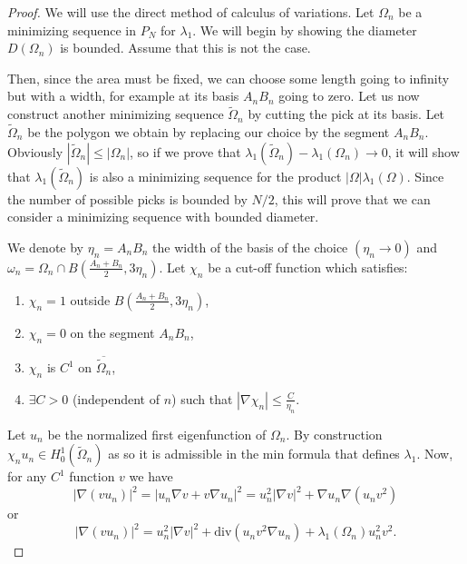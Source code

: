 \documentclass[12pt]{report}
\numberwithin{definition}{section}
\begin{document}
\begin{proof}

  We will use the direct method of calculus of variations.
  Let $\Omega_{n}$ be a minimizing sequence in $P_{N}$ for $\lambda_1$.
  We will begin by showing the diameter $D(\Omega_{n})$ is bounded.
  Assume that this is not the case.

  Then, since the area must be fixed, we can choose some length going to infinity but with a width, for example at its basis $A_{n}B_{n}$ going to zero.
  Let us now construct another minimizing sequence $\widetilde{\Omega}_{n}$ by cutting the pick at its basis.
  Let $\widetilde{\Omega}_{n}$ be the polygon we obtain by replacing our choice by the segment $A_{n}B_{n}$.
  Obviously $| \widetilde{\Omega}_{n} | \leq | \Omega_{n} | $, so if we prove that $\lambda_{1}(\widetilde{\Omega}_{n}) - \lambda_{1}(\Omega_{n}) \to 0$, it will show that $\lambda_{1}(\widetilde{\Omega}_{n})$ is also a minimizing sequence for the product $| \Omega | \lambda_{1}(\Omega)$.
  Since the number of possible picks is bounded by $N / 2$, this will prove that we can consider a minimizing sequence with bounded diameter.

  We denote by $\eta_{n} = A_{n}B_{n}$ the width of the basis of the choice $(\eta_{n} \to 0)$ and $\omega_{n} = \Omega_{n} \cap B(\frac{A_{n} + B_{n}}{2}, 3\eta_{n})$.
  Let $\chi_{n}$ be a cut-off function which satisfies:
  \begin{enumerate}
    \item $\chi_{n} = 1$ outside $B(\frac{A_{n} + B_{n}}{2}, 3\eta_{n})$,
    \item $\chi_{n} = 0$ on the segment $A_{n}B_{n}$,
    \item $\chi_{n}$ is $C^{1}$ on $\overline{\widetilde{\Omega}_{n}}$,
    \item $\exists C > 0$ (independent of $n$) such that $| \nabla \chi_{n} | \leq \frac{C}{\eta_{n}}$.
  \end{enumerate}

  Let $u_{n}$ be the normalized first eigenfunction of $\Omega_{n}$.
  By construction $\chi_{n}u_{n} \in H_{0}^{1}(\widetilde{\Omega}_{n})$ as so it is admissible in the min formula that defines $\lambda_{1}$.
  Now, for any $C^{1}$ function $v$ we have
  \[
  | \nabla(v u_{n}) |^{2} = | u_{n} \nabla v + v \nabla u_{n}  |^{2} = u_{n}^{2} | \nabla v |^{2} + \nabla u_{n} \nabla (u_{n}v^{2})
  \] 
  or 
  \[
    | \nabla(v u_{n}) |^{2} = u_{n}^{2} | \nabla v |^2 + \text{div} (u_{n} v^2 \nabla u_{n}) + \lambda_{1}(\Omega_{n})u_{n}^2 v^2
  .\] 


\end{proof}
\end{document}
